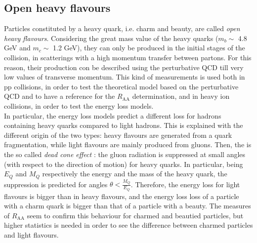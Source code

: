 \subsection{Open heavy flavours}
Particles constituted by a heavy quark, i.e. charm and beauty, are called \textit{open heavy flavours}. Considering the great mass value of the heavy quarks ($m_{b}\sim$ 4.8 GeV and $m_{c}\sim$ 1.2 GeV), they can only be produced in the initial stages of the collision, in scatterings with a high momentum transfer between partons. For this reason, their production con be described using the perturbative QCD till very low values of transverse momentum. This kind of measurements is used both in pp collisions, in order to test the theoretical model based on the perturbative QCD and to have a reference for the $R_{\mathrm{AA}}$ determination, and in heavy ion collisions, in order to test the energy loss models.\\
In particular, the energy loss models predict a different loss for hadrons containing heavy quarks compared to light hadrons. This is explained with the different origin of the two types: heavy flavours are generated from a quark fragmentation, while light flavours are mainly produced from gluons. Then, the is the so called \textit{dead cone effect} \cite{deadcone}: the gluon radiation is suppressed at small angles (with respect to the direction of motion) for heavy quarks. In particular, being $E_{Q}$ and $M_{Q}$ respectively the energy and the mass of the heavy quark, the suppression is predicted for angles $\theta<\frac{M_{Q}}{E_{Q}}$. Therefore, the energy loss for light flavours is bigger than in heavy flavours, and the energy loss loss of a particle with a charm quark is bigger than that of a particle with a beauty. The measures of $R_{\mathrm{AA}}$ seem to confirm this behaviour for charmed and beautied particles, but higher statistics is needed in order to see the difference between charmed particles and light flavours.
%
